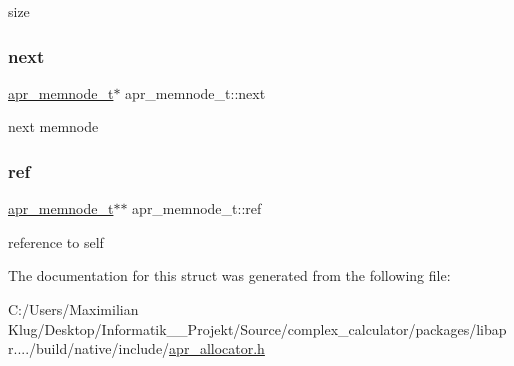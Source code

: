 size \mbox{\label{structapr__memnode__t_a07dd84ca152164d6bc283dbce99f8f78}} 
\subsubsection{\texorpdfstring{next}{next}}
{\footnotesize\ttfamily \mbox{\hyperlink{structapr__memnode__t}{apr\+\_\+memnode\+\_\+t}}$\ast$ apr\+\_\+memnode\+\_\+t\+::next}

next memnode \mbox{\label{structapr__memnode__t_ac68a939c0c3d48498ec0c0fde409c502}} 
\subsubsection{\texorpdfstring{ref}{ref}}
{\footnotesize\ttfamily \mbox{\hyperlink{structapr__memnode__t}{apr\+\_\+memnode\+\_\+t}}$\ast$$\ast$ apr\+\_\+memnode\+\_\+t\+::ref}

reference to self 

The documentation for this struct was generated from the following file\+:\begin{DoxyCompactItemize}
\item 
C\+:/\+Users/\+Maximilian Klug/\+Desktop/\+Informatik\+\_\+\_\+\+Projekt/\+Source/complex\+\_\+calculator/packages/libapr..../build/native/include/\mbox{\hyperlink{apr__allocator_8h}{apr\+\_\+allocator.\+h}}\end{DoxyCompactItemize}
